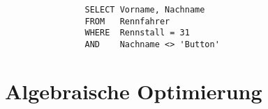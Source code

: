 \documentclass[ngerman]{gdb-aufgabenblatt}
\begin{document}
		\subsubsection{} %
			\begin{verbatim}
			    SELECT Vorname, Nachname
			    FROM   Rennfahrer
			    WHERE  Rennstall = 31
			    AND    Nachname <> 'Button'
			\end{verbatim}

\section{Algebraische Optimierung}
	\subsection{} %
	\subsection{} %
\end{document}
